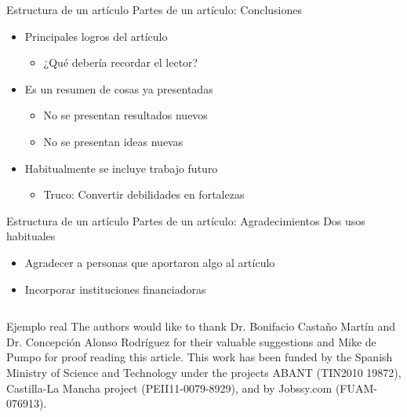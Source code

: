 \documentclass{beamer}
\begin{document}
\begin{frame}{Estructura de un artículo} {Partes de un artículo: Conclusiones}
	\begin{itemize}
		\item Principales logros del artículo
			\begin{itemize}
			\item ¿Qué debería recordar el lector?
			\end{itemize}
		\item Es un resumen de cosas ya presentadas
			\begin{itemize}
			\item No se presentan resultados nuevos
			\item No se presentan ideas nuevas
			\end{itemize}
		\item Habitualmente se incluye trabajo futuro
			\begin{itemize}
			\item Truco: Convertir debilidades en fortalezas
			\end{itemize}
	\end{itemize}
\end{frame}

\begin{frame}{Estructura de un artículo} {Partes de un artículo: Agradecimientos}
	Dos usos habituales
	\begin{itemize}
		\item Agradecer a personas que aportaron algo al artículo
		\item Incorporar instituciones financiadoras
	\end{itemize}
	\begin{columns}
	\begin{block}{Ejemplo real}
	\footnotesize{
The authors would like to thank Dr. Bonifacio Castaño Martín and Dr. Concepción Alonso Rodríguez for their valuable suggestions and Mike de Pumpo for proof reading this article. This work has been funded by the Spanish Ministry of Science and Technology under the projects ABANT (TIN2010 19872), Castilla-La Mancha project (PEII11-0079-8929), and by Jobssy.com (FUAM-076913).}
	\end{block}
	\end{columns}
\end{frame}
\end{document}
